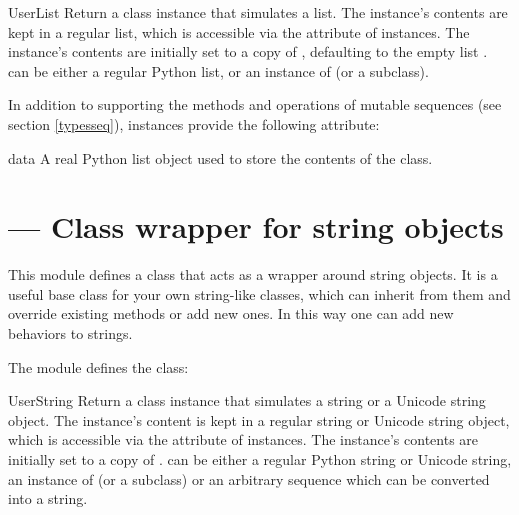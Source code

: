 \begin{classdesc}{UserList}{}
Return a class instance that simulates a list.  The instance's
contents are kept in a regular list, which is accessible via the
 attribute of  instances.  The instance's
contents are initially set to a copy of , defaulting to the
empty list \code{[]}.   can be either a regular Python list,
or an instance of  (or a subclass).
\end{classdesc}

In addition to supporting the methods and operations of mutable
sequences (see section \ref{typesseq}),  instances
provide the following attribute:

\begin{memberdesc}{data}
A real Python list object used to store the contents of the
 class.
\end{memberdesc}


\section{ ---
         Class wrapper for string objects}


This module defines a class that acts as a wrapper around
string objects.  It is a useful base class for
your own string-like classes, which can inherit from
them and override existing methods or add new ones.  In this way one
can add new behaviors to strings.

The  module defines the  class:

\begin{classdesc}{UserString}{}
Return a class instance that simulates a string or a Unicode string object.
The instance's content is kept in a regular string or Unicode string
object, which is accessible via the
 attribute of  instances.  The instance's
contents are initially set to a copy of .
 can be either a regular Python string or Unicode string,
an instance of  (or a subclass) or an arbitrary sequence
which can be converted into a string.
\end{classdesc}

